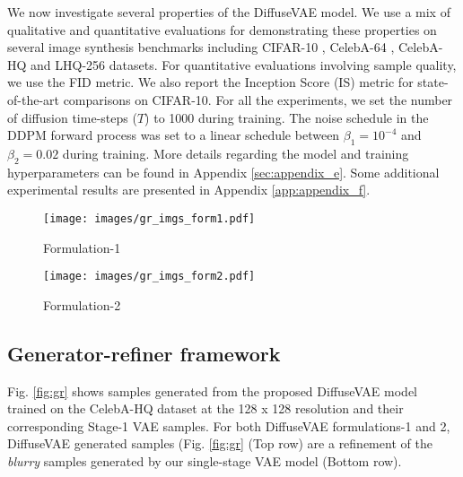 \documentclass[10pt]{article} \usepackage[accepted]{tmlr}
\begin{document}
We now investigate several properties of the DiffuseVAE model. We use a mix of qualitative and quantitative evaluations for demonstrating these properties on several image synthesis benchmarks including CIFAR-10 \citep{krizhevsky2009learning}, CelebA-64 \citep{liu2015faceattributes}, CelebA-HQ \citep{karras2018progressive} and LHQ-256 \citep{alis} datasets. For quantitative evaluations involving sample quality, we use the FID \citep{heusel2018gans} metric. We also report the Inception Score (IS) metric \citep{Salimans2016ImprovedTF} for state-of-the-art comparisons on CIFAR-10. For all the experiments, we set the number of diffusion time-steps ($T$) to 1000 during training. The noise schedule in the DDPM forward process was set to a linear schedule between $\beta_1 = 10^{-4}$ and $\beta_2 = 0.02$ during training. More details regarding the model and training hyperparameters can be found in Appendix \ref{sec:appendix_e}. Some additional experimental results are presented in Appendix \ref{app:appendix_f}.
\begin{figure*}
  \centering
  \begin{subfigure}{0.49\linewidth}
  \centering
    \texttt{[image: images/gr\_imgs\_form1.pdf]}
  \caption{Formulation-1}
  \label{fig:gr_form1}
  \end{subfigure}
  \begin{subfigure}{0.49\linewidth}
  \centering
    \texttt{[image: images/gr\_imgs\_form2.pdf]}
    \caption{Formulation-2}
    \label{fig:gr_form2}
  \end{subfigure}
  \caption{Illustration of the generator-refiner framework in DiffuseVAE. The VAE generated samples (Bottom row) are refined by the Stage-2 DDPM model with T=1000 during inference (Top Row).}
  \label{fig:gr}
\end{figure*}

\subsection{Generator-refiner framework}

Fig. \ref{fig:gr} shows samples generated from the proposed DiffuseVAE model trained on the CelebA-HQ dataset at the 128 x 128 resolution and their corresponding Stage-1 VAE samples. For both DiffuseVAE formulations-1 and 2, DiffuseVAE generated samples (Fig. \ref{fig:gr} (Top row) are a refinement of the \textit{blurry} samples generated by our single-stage VAE model (Bottom row).
\end{document}
